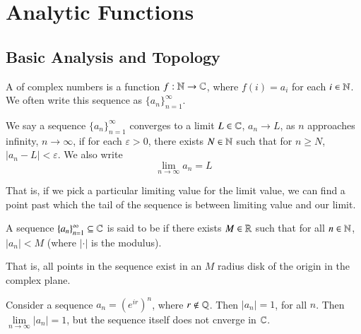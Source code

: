 %
%
%
\chapter{Analytic Functions}
\label{Analytic} %

\section{Basic Analysis and Topology}


\begin{definition}
    A  of complex numbers is a function $f:\mathbb N\rightarrow \mathbb C$, where $f(i) = a_i$ for each $i \in \mathbb N$. We often write this sequence as $\{a_n\}_{n=1}^{\infty}$.
\end{definition}

\begin{definition}
    We say a sequence $\{a_n\}_{n=1}^{\infty}$ converges to a limit $L \in \mathbb C$, $a_n\rightarrow L$, as $n$ approaches infinity, $n\rightarrow \infty$, if for each $\varepsilon > 0$, there exists $N \in \mathbb N$ such that for $n \geq N$, $|a_n - L| < \varepsilon$. We also write \begin{equation*}
        \lim\limits_{n\rightarrow \infty}a_n = L
    \end{equation*}
\end{definition}

That is, if we pick a particular limiting value for the limit value, we can find a point past which the tail of the sequence is between limiting value and our limit.

\begin{definition}
    A sequence $\{a_n\}_{n=1}^{\infty} \subseteq \mathbb C$ is said to be  if there exists $M \in \mathbb R$ such that for all $n \in \mathbb N$, $|a_n| < M$ (where $|\cdot|$ is the modulus).
\end{definition}

That is, all points in the sequence exist in an $M$ radius disk of the origin in the complex plane. 

\begin{example}
    Consider a sequence $a_n = (e^{ir})^n$, where $r \notin \mathbb Q$. Then $|a_n| = 1$, for all $n$. Then $\lim\limits_{n\rightarrow \infty}|a_n| = 1$, but the sequence itself does not cnverge in $\mathbb C$.
\end{example}


